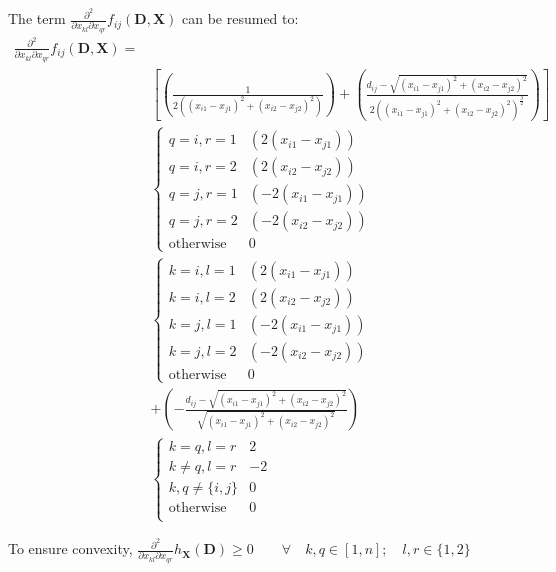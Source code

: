 \documentclass[a4paper,12pt]{article}
\begin{document}
The term $\frac{\partial^2}{\partial x_{kl} \partial x_{qr}} f_{ij}(\bm{D}, \bm{X})$ can be resumed to:
\begin{equation}
    \begin{aligned}
        \frac{\partial^2}{\partial x_{kl} \partial x_{qr}} f_{ij}(\bm{D}, \bm{X}) = 
    \\ & \left[\left(\frac{1}{2\left((x_{i1} - x_{j1})^2 + (x_{i2} - x_{j2})^2\right)} \right) 
    +  \left(\frac{d_{ij} - \sqrt{(x_{i1} - x_{j1})^2 + (x_{i2} - x_{j2})^2} }{2\left((x_{i1} - x_{j1})^2 + (x_{i2} - x_{j2})^2\right)^{\frac{3}{2}}} \right) \right]
    \\ &\begin{cases}
        q=i,r=1 & \left(2(x_{i1} - x_{j1})\right)\\
        q=i,r=2 & \left(2(x_{i2} - x_{j2})\right)\\
        q=j,r=1 & \left(-2(x_{i1} - x_{j1})\right)\\
        q=j,r=2 & \left(-2(x_{i2} - x_{j2})\right)\\
        \text{otherwise} & 0
    \end{cases}
    \\ &\begin{cases}
        k=i,l=1 & \left(2(x_{i1} - x_{j1})\right)\\
        k=i,l=2 & \left(2(x_{i2} - x_{j2})\right)\\
        k=j,l=1 & \left(-2(x_{i1} - x_{j1})\right)\\
        k=j,l=2 & \left(-2(x_{i2} - x_{j2})\right)\\
        \text{otherwise} & 0
    \end{cases}
    \\ & + \left(-\frac{d_{ij} - \sqrt{(x_{i1} - x_{j1})^2 + (x_{i2} - x_{j2})^2}}{\sqrt{(x_{i1} - x_{j1})^2 + (x_{i2} - x_{j2})^2}} \right) 
    \\ &\begin{cases}
        k = q, l=r & 2 \\
        k \ne q, l=r & -2 \\
        k,q \ne \{i,j\}  & 0 \\
        \text{otherwise} & 0 \\
    \end{cases}
    \end{aligned}
\end{equation}


To ensure convexity, $\frac{\partial^2}{\partial x_{kl} \partial x_{qr}} h_{\bm{X}}(\bm{D}) \ge 0 \quad \quad\forall \quad k,q \in [1, n];\quad l,r \in \{1,2\} $
\end{document}
